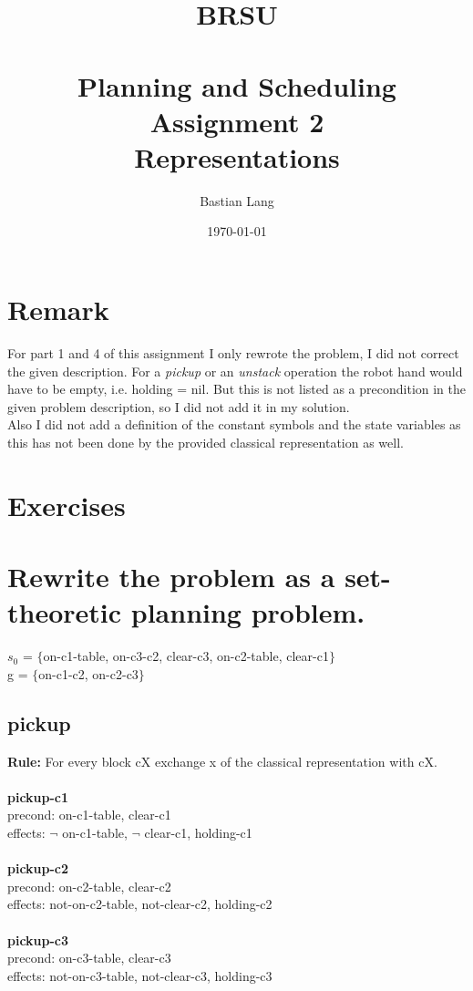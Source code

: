 \documentclass[paper=a4, fontsize=11pt]{scrartcl} %
\title{	
\normalfont \normalsize 
\textsc{BRSU} \\ [25pt] %
\horrule{0.5pt} \\[0.4cm] %
\huge Planning and Scheduling\\Assignment 2 \\
Representations %
\horrule{2pt} \\[0.5cm] %
}
\author{Bastian Lang} %
\date{\normalsize\today} %
\numberwithin{equation}{section} %
\numberwithin{figure}{section} %
\numberwithin{table}{section} %
\begin{document}
\maketitle %

\section{Remark}
For part 1 and 4 of this assignment I only rewrote the problem, I did not correct the given description. For a \textit{pickup} or an \textit{unstack} operation the robot hand would have to be empty, i.e. holding = nil. But this is not listed as a precondition in the given problem description, so I did not add it in my solution.\\
Also I did not add a definition of the constant symbols and the state variables as this has not been done by the provided classical representation as well. 

\section{Exercises}
\section{Rewrite the problem as a set-theoretic planning problem.}
$s_0$ = $\{$on-c1-table, on-c3-c2, clear-c3, on-c2-table, clear-c1$\}$\\
g = $\{$on-c1-c2, on-c2-c3$\}$
\subsection{pickup}
\textbf{Rule:} For every block cX exchange x of the classical representation with cX.\\\\

\textbf{pickup-c1}\\
precond: on-c1-table, clear-c1\\
effects: $\lnot$ on-c1-table, $\lnot$ clear-c1, holding-c1\\\\

\textbf{pickup-c2}\\
precond: on-c2-table, clear-c2\\
effects: not-on-c2-table, not-clear-c2, holding-c2\\\\

\textbf{pickup-c3}\\
precond: on-c3-table, clear-c3\\
effects: not-on-c3-table, not-clear-c3, holding-c3\\
\end{document}
